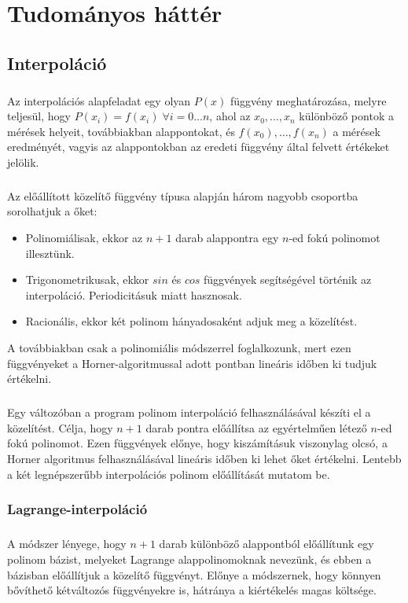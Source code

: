 \documentclass[12pt]{report}
\begin{document}
\chapter{Tudományos háttér}
\section{Interpoláció}
\paragraph{}
Az interpolációs alapfeladat egy olyan $P(x)$ függvény meghatározása, melyre teljesül, hogy $P(x_i)=f(x_i) \; \forall i = 0 \dots n$, ahol az $x_0, \dots, x_n$ különböző pontok a mérések helyeit, továbbiakban alappontokat, és $f(x_0), \dots, f(x_n)$ a mérések eredményét, vagyis az alappontokban az eredeti függvény által felvett értékeket jelölik.
\paragraph{}
Az előállított közelítő függvény típusa alapján három nagyobb csoportba sorolhatjuk a őket:
\begin{itemize}
\item Polinomiálisak, ekkor az $n+1$ darab alappontra egy $n$-ed fokú polinomot illesztünk.
\item Trigonometrikusak, ekkor $sin$ és $cos$ függvények segítségével történik az interpoláció. Periodicitásuk miatt hasznosak.
\item Racionális, ekkor két polinom hányadosaként adjuk meg a közelítést.
\end{itemize}
A továbbiakban csak a polinomiális módszerrel foglalkozunk, mert ezen függvényeket a Horner-algoritmussal adott pontban lineáris időben ki tudjuk értékelni.
\paragraph{}
Egy változóban a program polinom interpoláció felhasználásával készíti el a közelítést. Célja, hogy $n+1$ darab pontra előállítsa az egyértelműen létező $n$-ed fokú polinomot. Ezen függvények előnye, hogy kiszámításuk viszonylag olcsó, a Horner algoritmus felhasználásával lineáris időben ki lehet őket értékelni. Lentebb a két legnépszerűbb interpolációs polinom előállítását mutatom be. 
\subsection{Lagrange-interpoláció}
\paragraph{}
A módszer lényege, hogy $n+1$ darab különböző alappontból előállítunk egy polinom bázist, melyeket Lagrange alappolinomoknak nevezünk, és ebben a bázisban előállítjuk a közelítő függvényt. Előnye a módszernek, hogy könnyen bővíthető kétváltozós függvényekre is, hátránya a kiértékelés magas költsége.
\end{document}
